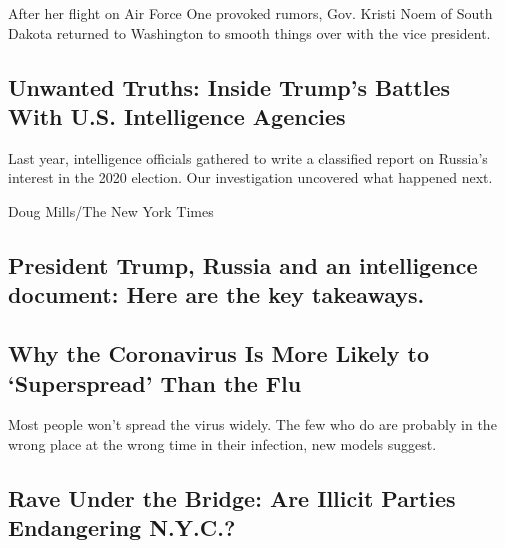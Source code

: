 After her flight on Air Force One provoked rumors, Gov. Kristi Noem of
South Dakota returned to Washington to smooth things over with the vice
president.

\href{/2020/08/08/magazine/us-russia-intelligence.html}{}

\hypertarget{unwanted-truths-inside-trumps-battles-with-us-intelligence-agencies}{%
\subsection{Unwanted Truths: Inside Trump's Battles With U.S.
Intelligence
Agencies}\label{unwanted-truths-inside-trumps-battles-with-us-intelligence-agencies}}

Last year, intelligence officials gathered to write a classified report
on Russia's interest in the 2020 election. Our investigation uncovered
what happened next.

\href{/2020/08/08/magazine/us-russia-intelligence.html}{}

Doug Mills/The New York Times

\href{/2020/08/08/us/politics/trump-russia.html}{}

\hypertarget{president-trump-russia-and-an-intelligence-document-here-are-the-key-takeaways}{%
\subsection{President Trump, Russia and an intelligence document: Here
are the key
takeaways.}\label{president-trump-russia-and-an-intelligence-document-here-are-the-key-takeaways}}

\href{/2020/08/07/health/coronavirus-superspreading-contagion.html}{}

\hypertarget{why-the-coronavirus-is-more-likely-to-superspread-than-the-flu}{%
\subsection{Why the Coronavirus Is More Likely to `Superspread' Than the
Flu}\label{why-the-coronavirus-is-more-likely-to-superspread-than-the-flu}}

Most people won't spread the virus widely. The few who do are probably
in the wrong place at the wrong time in their infection, new models
suggest.

\href{/2020/08/08/nyregion/nyc-illegal-parties.html}{}

\hypertarget{rave-under-the-bridge-are-illicit-parties-endangering-nyc}{%
\subsection{Rave Under the Bridge: Are Illicit Parties Endangering
N.Y.C.?}\label{rave-under-the-bridge-are-illicit-parties-endangering-nyc}}

